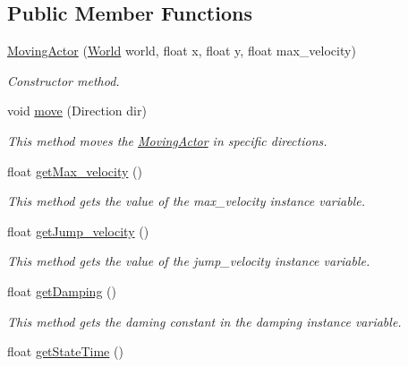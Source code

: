 \subsection*{Public Member Functions}
\begin{DoxyCompactItemize}
\item 
\hyperlink{classnl_1_1arjanfrans_1_1mario_1_1model_1_1MovingActor_a56800b4b8e8457bb2e0f1a4ad38b6576}{Moving\+Actor} (\hyperlink{classnl_1_1arjanfrans_1_1mario_1_1model_1_1World}{World} world, float x, float y, float max\+\_\+velocity)
\begin{DoxyCompactList}\small\item\em Constructor method. \end{DoxyCompactList}\item 
void \hyperlink{classnl_1_1arjanfrans_1_1mario_1_1model_1_1MovingActor_a0abaf6ff6ce1a5237a268f29e433a5ed}{move} (Direction dir)
\begin{DoxyCompactList}\small\item\em This method moves the \hyperlink{classnl_1_1arjanfrans_1_1mario_1_1model_1_1MovingActor}{Moving\+Actor} in specific directions. \end{DoxyCompactList}\item 
float \hyperlink{classnl_1_1arjanfrans_1_1mario_1_1model_1_1MovingActor_a4afede59283c8dec6fcbf8ee31244320}{get\+Max\+\_\+velocity} ()
\begin{DoxyCompactList}\small\item\em This method gets the value of the max\+\_\+velocity instance variable. \end{DoxyCompactList}\item 
float \hyperlink{classnl_1_1arjanfrans_1_1mario_1_1model_1_1MovingActor_aad83e64b051035aeec7b60f32a44ea6f}{get\+Jump\+\_\+velocity} ()
\begin{DoxyCompactList}\small\item\em This method gets the value of the jump\+\_\+velocity instance variable. \end{DoxyCompactList}\item 
float \hyperlink{classnl_1_1arjanfrans_1_1mario_1_1model_1_1MovingActor_afad55ab6f56af85122985d51001e12fd}{get\+Damping} ()
\begin{DoxyCompactList}\small\item\em This method gets the daming constant in the damping instance variable. \end{DoxyCompactList}\item 
float \hyperlink{classnl_1_1arjanfrans_1_1mario_1_1model_1_1MovingActor_a2f5be4a9802efe50a98368729ab46472}{get\+State\+Time} ()

\end{DoxyCompactItemize}
